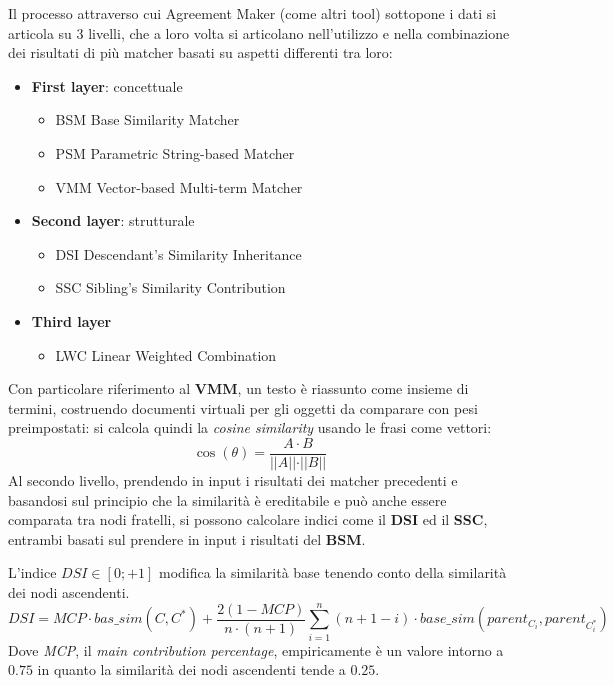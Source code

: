 \documentclass[11pt]{article}
\begin{document}
Il processo attraverso cui Agreement Maker (come altri tool) sottopone i dati si articola su 3 livelli, che a loro volta si articolano nell'utilizzo e nella combinazione dei risultati di più matcher basati su aspetti differenti tra loro:
\begin{itemize}
\item \textbf{First layer}: concettuale
\begin{itemize}
\item BSM Base Similarity Matcher
\item PSM Parametric String-based Matcher
\item VMM Vector-based Multi-term Matcher
\end{itemize}
\item \textbf{Second layer}: strutturale
\begin{itemize}
\item DSI Descendant's Similarity Inheritance
\item SSC Sibling's Similarity Contribution
\end{itemize}
\item \textbf{Third layer}
\begin{itemize}
\item LWC Linear Weighted Combination
\end{itemize}
\end{itemize}
Con particolare riferimento al \textbf{VMM}, un testo è riassunto come insieme di termini, costruendo documenti virtuali per gli oggetti da comparare con pesi preimpostati: si calcola quindi la \textit{cosine similarity} usando le frasi come vettori:
\begin{equation*}
\cos(\theta) = \frac{A \cdot B}{\vert\vert A \vert\vert \cdot \vert\vert B \vert\vert}
\end{equation*}
Al secondo livello, prendendo in input i risultati dei matcher precedenti e basandosi sul principio che la similarità è ereditabile e può anche essere comparata tra nodi fratelli, si possono calcolare indici come il \textbf{DSI} ed il \textbf{SSC}, entrambi basati sul prendere in input i risultati del \textbf{BSM}.

L'indice $DSI \in [0; +1]$ modifica la similarità base tenendo conto della similarità dei nodi ascendenti.
\begin{equation*}
  DSI = MCP \cdot bas\_sim(C, C^*) + \frac{2(1 - MCP)}{n \cdot (n + 1)} \sum_{i=1}^n(n + 1 - i) \cdot base\_sim(parent_{C_i}, parent_{C^*_i})
\end{equation*}
Dove \textit{MCP}, il \textit{main contribution percentage}, empiricamente è un valore intorno a $0.75$ in quanto la similarità dei nodi ascendenti tende a $0.25$. \newline
\end{document}
